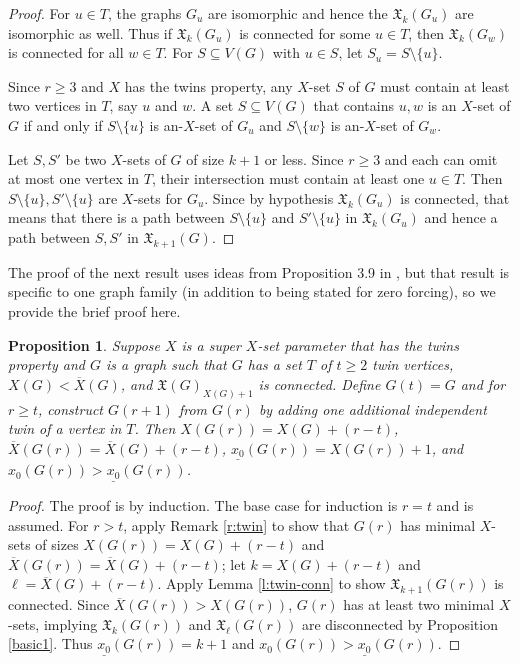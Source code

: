 \documentclass{article}
\def\blu{\color{blue}}
\numberwithin{figure}{section}
\numberwithin{table}{section}
\numberwithin{equation}{section}
\newtheorem{prop}[thm]{Proposition}
\theoremstyle{definition}
\theoremstyle{definition}
\theoremstyle{definition}
\newcommand{\bpf}{\begin{proof}}
\newcommand{\epf}{\end{proof}\ms}
\newcommand{\ms}{\medskip}
\newcommand{\ol}{\overline}
\newcommand{\Xb}{X}
\newcommand{\xbar}{\ol X}
\newcommand{\xbbar}{\ol X}
\newcommand{\xbtar}{\mathfrak{X}}%
\newcommand{\xbo}{x_0}
\newcommand{\ulxbo}{\underline{x_0}}
\begin{document}
{{\blu  \bpf For $u\in T$, the graphs  $G_u$ are isomorphic and hence the ${\xbtar}_{k}(G_u)$ are isomorphic as well.  Thus if ${\xbtar}_{k}(G_u)$ is connected for some $u\in T$,  then ${\xbtar}_{k}(G_w)$ is connected for all $w\in T$.  For  $S\subseteq V(G)$ with $u\in S$, let $S_u=S\setminus \{u\}$.  

Since $r\ge 3$ and $\Xb$ has the twins property,  any $\Xb$-set $S$ of $G$ must contain at least two vertices in $T$, say $u$ and $w$.  A set  $S\subseteq V(G) $  that contains $u,w$  is an $\Xb$-set of $G$  if and only if  $S \setminus \{u\}$ is an-$X$-set of $G_u$ and  $S \setminus \{w\}$ is an-$X$-set of $G_w$.  

Let $S, S'$ be  two $X$-sets  of $G$ of size $k+1$ or less.  Since $r\ge 3$  and each can omit at most one  vertex in $T$, their intersection must contain at least one  $u \in T$. Then $S\setminus \{u\}, S'\setminus \{u\} $ are $\Xb$-sets for $G_u$. Since by hypothesis ${\xbtar}_{k}(G_u)$ is connected, that means that there is a path between $S\setminus \{u\}$ and  $S'\setminus \{u\} $ in ${\xbtar}_{k}(G_u)$ and hence a path between $S, S'$ in ${\xbtar}_{k+1}(G)$.
\epf}



The proof of the next result uses ideas from Proposition 3.9 
in \cite{XTARiso}, but that result is specific to one graph family (in addition to being stated for zero forcing), so we provide the brief proof here.  

\begin{prop}\label{p:xso-lowxso} Suppose $\Xb$ is a super $X$-set parameter that has the twins property and $G$ is a graph such that  $G$ has a set $T$ of $t\ge 2$ twin vertices,      $\Xb(G)<\xbbar(G)$, and  $\xbtar(G)_{\Xb(G)+1}$ is connected. 
 Define  $G(t)=G$ and for $r\ge t$, construct $G(r+1)$ from $G(r)$ by adding one additional independent twin of a vertex in $T$.  Then $\Xb(G(r))=\Xb(G)+(r-t)$, $\xbbar(G(r))=\xbbar(G)+(r-t)$, $\ulxbo(G(r))=\Xb(G(r))+1$, and $\xbo(G(r))>\ulxbo(G(r))$.
\end{prop} 

\bpf  The proof is by induction.  The base case for induction is $r=t$ and is assumed.  For $r>t$, apply Remark \ref{r:twin} to show that $G(r)$ has minimal $X$-sets of sizes $\Xb(G(r))=\Xb(G)+(r-t)$ and $\xbbar(G(r))=\xbbar(G)+(r-t)$; let $k=\Xb(G)+(r-t)$ and $\ell=\xbar(G)+(r-t)$.  Apply Lemma \ref{l:twin-conn} to show ${\xbtar}_{k+1}(G(r))$ is connected. Since $\xbbar(G(r))>\Xb(G(r))$, $G(r)$ has at least two minimal $\Xb$-sets, implying ${\xbtar}_{k}(G(r))$ and ${\xbtar}_{\ell}(G(r))$ are disconnected by Proposition \ref{basic1}.  Thus
$\ulxbo(G(r))=k+1$ and $\xbo(G(r))>\ulxbo(G(r))$.  
\epf

}
\end{document}
